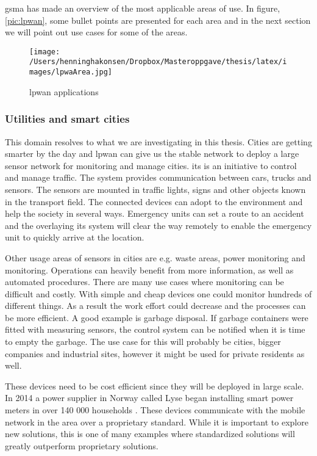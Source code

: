 \documentclass[USenglish]{ifimaster}  %
\begin{document}
\acrfull{gsma} has made an overview of the most applicable areas of use. In figure, \vref{pic:lpwan}, some bullet points are presented for each area and in the next section we will point out use cases for some of the areas.

\begin{figure}[ht]
  \centering\texttt{[image: /Users/henninghakonsen/Dropbox/Masteroppgave/thesis/latex/images/lpwaArea.jpg]}
  \caption[\acrshort{lpwan} applications]{\acrshort{lpwan} applications \cite{online:lpwaFuture}}
  \label{pic:lpwan}
\end{figure}

\subsubsection{Utilities and smart cities}
This domain resolves to what we are investigating in this thesis. Cities are getting smarter by the day and \acrshort{lpwan} can give us the stable network to deploy a large sensor network for monitoring and manage cities. \acrfull{its} is an initiative to control and manage traffic. The system provides communication between cars, trucks and sensors. The sensors are mounted in traffic lights, signs and other objects known in the transport field. The connected devices can adopt to the environment and help the society in several ways. Emergency units can set a route to an accident and the overlaying \acrshort{its} system will clear the way remotely to enable the emergency unit to quickly arrive at the location.

Other usage areas of sensors in cities are e.g. waste areas, power monitoring and  monitoring. Operations can heavily benefit from more information, as well as automated procedures. There are many use cases where monitoring can be difficult and costly. With simple and cheap devices one could monitor hundreds of different things. As a result the work effort could decrease and the processes can be more efficient. A good example is garbage disposal. If garbage containers were fitted with measuring sensors, the control system can be notified when it is time to empty the garbage. The use case for this will probably be cities, bigger companies and industrial sites, however it might be used for private residents as well.

These devices need to be cost efficient since they will be deployed in large scale. In 2014 a power supplier in Norway called Lyse began installing smart power meters in over 140 000 households \cite{online:lyseAMS}. These devices communicate with the mobile network in the area over a proprietary standard. While it is important to explore new solutions, this is one of many examples where standardized solutions will greatly outperform proprietary solutions.
\end{document}

